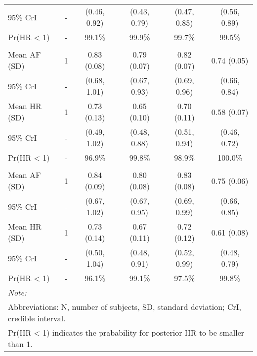 \documentclass[nutrients,article,submitted,moreauthors,pdftex]{Definitions/mdpi}
\begin{document}
\begin{table}[H]
{\begin{tabular}[t]{lccccc}
\rowcolor{gray!6}  \hspace{1em}95\% CrI & - & (0.46, 0.92) & (0.43, 0.79) & (0.47, 0.85) & (0.56, 0.89)\\
\hspace{1em}Pr(HR < 1) & - & 99.1\% & 99.9\% & 99.7\% & 99.5\%\\
\addlinespace[0.3em]
\multicolumn{6}{l}{\textbf{Model 1}}\\
\rowcolor{gray!6}  \hspace{1em}Mean AF (SD) & 1 & 0.83 (0.08) & 0.79 (0.07) & 0.82 (0.07) & 0.74 (0.05)\\
\hspace{1em}95\% CrI & - & (0.68, 1.01) & (0.67, 0.93) & (0.69, 0.96) & (0.66, 0.84)\\
\rowcolor{gray!6}  \hspace{1em}Mean HR (SD) & 1 & 0.73 (0.13) & 0.65 (0.10) & 0.70 (0.11) & 0.58 (0.07)\\
\hspace{1em}95\% CrI & - & (0.49, 1.02) & (0.48, 0.88) & (0.51, 0.94) & (0.46, 0.72)\\
\rowcolor{gray!6}  \hspace{1em}Pr(HR < 1) & - & 96.9\% & 99.8\% & 98.9\% & 100.0\%\\
\addlinespace[0.3em]
\multicolumn{6}{l}{\textbf{Model 2}}\\
\hspace{1em}Mean AF (SD) & 1 & 0.84 (0.09) & 0.80 (0.08) & 0.83 (0.08) & 0.75 (0.06)\\
\rowcolor{gray!6}  \hspace{1em}95\% CrI & - & (0.67, 1.02) & (0.67, 0.95) & (0.69, 0.99) & (0.66, 0.85)\\
\hspace{1em}Mean HR (SD) & 1 & 0.73 (0.14) & 0.67 (0.11) & 0.72 (0.12) & 0.61 (0.08)\\
\rowcolor{gray!6}  \hspace{1em}95\% CrI & - & (0.50, 1.04) & (0.48, 0.91) & (0.52, 0.99) & (0.48, 0.79)\\
\hspace{1em}Pr(HR < 1) & - & 96.1\% & 99.1\% & 97.5\% & 99.8\%\\
\bottomrule
\multicolumn{6}{l}{\textit{Note: }}\\
\multicolumn{6}{l}{Abbreviations: N, number of subjects, SD, standard deviation; CrI, credible interval.}\\
\multicolumn{6}{l}{ Pr(HR < 1) indicates the prabability for posterior HR to be smaller than 1.}\\

\end{tabular}}
\end{table}
\end{document}
